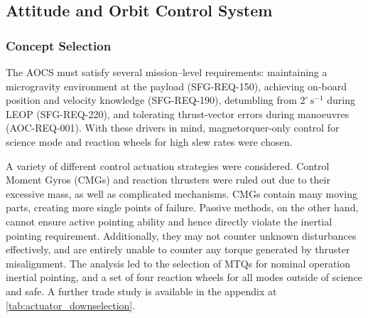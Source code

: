 \documentclass[a4paper, 11pt, conference]{IEEEtran}
\begin{document}
\subsection{Attitude and Orbit Control System}
\subsubsection{Concept Selection}
The AOCS must satisfy several mission–level requirements: maintaining a microgravity environment at the payload (SFG-REQ-150), achieving on-board position and velocity knowledge (SFG-REQ-190), detumbling from $2^{\circ}\,\mathrm{s}^{-1}$ during LEOP (SFG-REQ-220), and tolerating thrust-vector errors during manoeuvres (AOC-REQ-001). With these drivers in mind, magnetorquer-only control for science mode and reaction wheels for high slew rates were chosen. 

A variety of different control actuation strategies were considered. Control Moment Gyros (CMGs) and reaction thrusters were ruled out due to their excessive mass, as well as complicated mechanisms. CMGs contain many moving parts, creating more single points of failure. Passive methods, on the other hand, cannot ensure active pointing ability and hence directly violate the inertial pointing requirement. Additionally, they may not counter unknown disturbances effectively, and are entirely unable to counter any torque generated by thruster misalignment. The analysis led to the selection of MTQs for nominal operation inertial pointing, and a set of four reaction wheels for all modes outside of science and safe. A further trade study is available in the appendix at \autoref{tab:actuator_downselection}.
\end{document}
